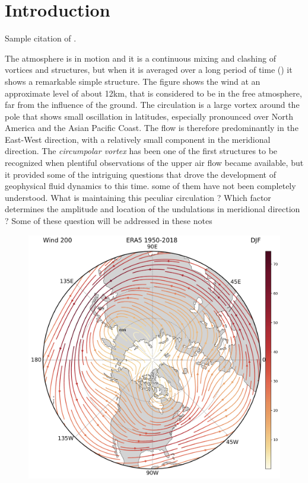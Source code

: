 \section{Introduction}\label{introduction}

Sample citation of \citet{Richardson1922}.

The atmosphere is in motion and it is a continuous mixing and clashing
of vortices and structures, but when it is averaged over a long period
of time (\fig{\ref{fig:ERA5-wind200}}) it shows a remarkable simple structure.
The figure shows the wind at an approximate level of about 12km, that is
considered to be in the free atmosphere, far from the influence of the
ground. The circulation is a large vortex around the pole that shows
small oscillation in latitudes, especially pronounced over North America
and the Asian Pacific Coast. The flow is therefore predominantly in the
East-West direction, with a relatively small component in the meridional
direction. The \emph{circumpolar vortex} has been one of the first
structures to be recognized when plentiful observations of the upper air
flow became available, but it provided some of the intriguing questions
that drove the development of geophysical fluid dynamics to this time.
some of them have not been completely understood. What is maintaining
this peculiar circulation ? Which factor determines the amplitude and
location of the undulations in meridional direction ? Some of these
question will be addressed in these notes

\begin{figure}
\centering
\includegraphics[width = .7 \textwidth]{figs/GD/Wind200.png}
\caption{}
\label{fig:ERA5-wind200}
\end{figure}


